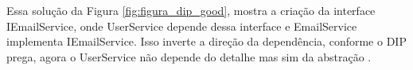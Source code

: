     \par Essa solução da Figura \ref{fig:figura_dip_good}, mostra a criação da interface IEmailService, onde UserService depende dessa interface e EmailService implementa IEmailService. Isso inverte a direção da dependência, conforme o DIP prega, agora o UserService não depende do detalhe mas sim da abstração \cite{artigo:ramachandrappa:2024}.